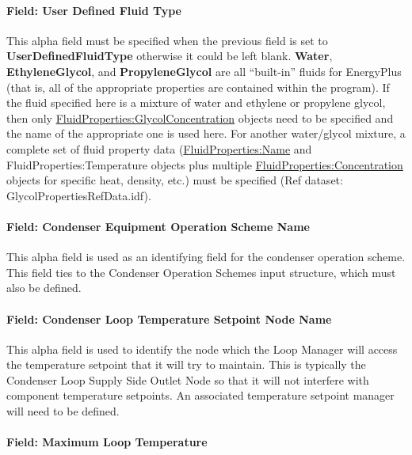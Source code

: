 \paragraph{Field: User Defined Fluid Type}\label{field-user-defined-fluid-type-1}

This alpha field must be specified when the previous field is set to \textbf{UserDefinedFluidType} otherwise it could be left blank. \textbf{Water}, \textbf{EthyleneGlycol}, and \textbf{PropyleneGlycol} are all ``built-in'' fluids for EnergyPlus (that is, all of the appropriate properties are contained within the program). If the fluid specified here is a mixture of water and ethylene or propylene glycol, then only \hyperref[fluidpropertiesglycolconcentration]{FluidProperties:GlycolConcentration} objects need to be specified and the name of the appropriate one is used here. For another water/glycol mixture, a complete set of fluid property data (\hyperref[fluidpropertiesname]{FluidProperties:Name} and FluidProperties:Temperature objects plus multiple \hyperref[fluidpropertiesconcentration]{FluidProperties:Concentration} objects for specific heat, density, etc.) must be specified (Ref dataset: GlycolPropertiesRefData.idf).

\paragraph{Field: Condenser Equipment Operation Scheme Name}\label{field-condenser-equipment-operation-scheme-name}

This alpha field is used as an identifying field for the condenser operation scheme. This field ties to the Condenser Operation Schemes input structure, which must also be defined.

\paragraph{Field: Condenser Loop Temperature Setpoint Node Name}\label{field-condenser-loop-temperature-setpoint-node-name}

This alpha field is used to identify the node which the Loop Manager will access the temperature setpoint that it will try to maintain. This is typically the Condenser Loop Supply Side Outlet Node so that it will not interfere with component temperature setpoints. An associated temperature setpoint manager will need to be defined.

\paragraph{Field: Maximum Loop Temperature}\label{field-maximum-loop-temperature-1}

